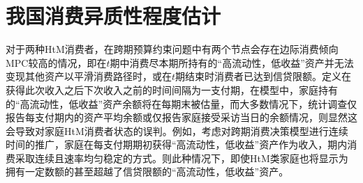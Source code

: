 \documentclass[supercite]{HustGraduPaper}
\begin{document}
    \section{我国消费异质性程度估计}
    对于两种HtM消费者，在跨期预算约束问题中有两个节点会存在边际消费倾向MPC较高的情况，即在$t$期中消费尽本期所持有的“高流动性，低收益”资产并无法变现其他资产以平滑消费路径时，或在$t$期结束时消费者已达到信贷限额。定义在获得此次收入之后下次收入之前的时间间隔为一支付期，在模型中，家庭持有的“高流动性，低收益”资产余额将在每期末被估量，而大多数情况下，统计调查仅报告每支付期内的资产平均余额或仅报告家庭接受采访当日的余额情况，则显然这会导致对家庭HtM消费者状态的误判。例如，考虑对跨期消费决策模型进行连续时间的推广，家庭在每支付期期初获得“高流动性，低收益”资产作为收入，期内消费采取连续且速率均匀稳定的方式。则此种情况下，即使HtM类家庭也将显示为拥有一定数额的甚至超越了信贷限额的“高流动性，低收益”资产。
\end{document}

